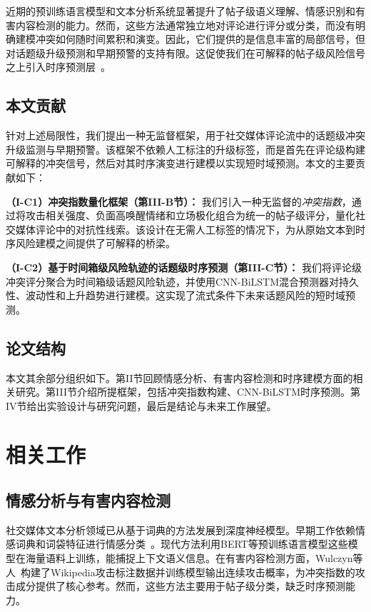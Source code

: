 \documentclass[conference]{IEEEtran}
\begin{document}
近期的预训练语言模型和文本分析系统显著提升了帖子级语义理解、情感识别和有害内容检测的能力。然而，这些方法通常独立地对评论进行评分或分类，而没有明确建模冲突如何随时间累积和演变。因此，它们提供的是信息丰富的局部信号，但对话题级升级预测和早期预警的支持有限。这促使我们在可解释的帖子级风险信号之上引入时序预测层~\cite{Abdalgader2025}。

\subsection{本文贡献}

针对上述局限性，我们提出一种无监督框架，用于社交媒体评论流中的话题级冲突升级监测与早期预警。该框架不依赖人工标注的升级标签，而是首先在评论级构建可解释的冲突信号，然后对其时序演变进行建模以实现短时域预测。本文的主要贡献如下：

\noindent\textbf{（I-C1）冲突指数量化框架（第III-B节）：}
我们引入一种无监督的\emph{冲突指数}，通过将攻击相关强度、负面高唤醒情绪和立场极化组合为统一的帖子级评分，量化社交媒体评论中的对抗性线索。该设计在无需人工标签的情况下，为从原始文本到时序风险建模之间提供了可解释的桥梁。

\noindent\textbf{（I-C2）基于时间箱级风险轨迹的话题级时序预测（第III-C节）：}
我们将评论级冲突评分聚合为时间箱级话题风险轨迹，并使用CNN-BiLSTM混合预测器对持久性、波动性和上升趋势进行建模。这实现了流式条件下未来话题风险的短时域预测。


\subsection{论文结构}

本文其余部分组织如下。第II节回顾情感分析、有害内容检测和时序建模方面的相关研究。第III节介绍所提框架，包括冲突指数构建、CNN-BiLSTM时序预测。第IV节给出实验设计与研究问题，最后是结论与未来工作展望。

\section{相关工作}

\subsection{情感分析与有害内容检测}

社交媒体文本分析领域已从基于词典的方法发展到深度神经模型。早期工作依赖情感词典和词袋特征进行情感分类~\cite{Kaity2020}。现代方法利用BERT等预训练语言模型\textemdash 这些模型在海量语料上训练，能捕捉上下文语义信息。在有害内容检测方面，Wulczyn等人~\cite{Wulczyn2017}构建了Wikipedia攻击标注数据并训练模型输出连续攻击概率，为冲突指数的攻击成分提供了核心参考。然而，这些方法主要用于帖子级分类，缺乏时序预测能力。
\end{document}
